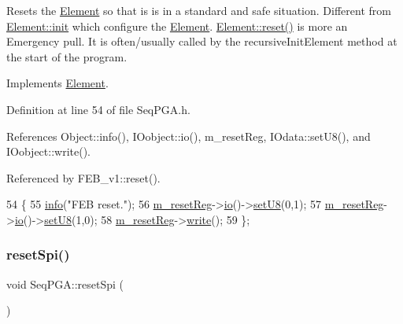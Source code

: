 Resets the \hyperlink{classElement}{Element} so that is is in a standard and safe situation. Different from \hyperlink{classElement_af42754b5cabc198869222725218d695c}{Element\+::init} which configure the \hyperlink{classElement}{Element}. \hyperlink{classElement_a69efffa22f06909d768149715565cb56}{Element\+::reset()} is more an Emergency pull. It is often/usually called by the recursive\+Init\+Element method at the start of the program. 

Implements \hyperlink{classElement_a69efffa22f06909d768149715565cb56}{Element}.



Definition at line 54 of file Seq\+P\+G\+A.\+h.



References Object\+::info(), I\+Oobject\+::io(), m\+\_\+reset\+Reg, I\+Odata\+::set\+U8(), and I\+Oobject\+::write().



Referenced by F\+E\+B\+\_\+v1\+::reset().


\begin{DoxyCode}
54                \{
55     \hyperlink{classObject_a644fd329ea4cb85f54fa6846484b84a8}{info}(\textcolor{stringliteral}{"FEB reset."});
56     \hyperlink{classSeqPGA_a8c519e98b992ab872622e95dae4461d8}{m\_resetReg}->\hyperlink{classIOobject_af04fb94137c3d86849f478ac5afab5d1}{io}()->\hyperlink{classIOdata_a6c4fb2f2af01889ada889c2b7aceb24d}{setU8}(0,1);
57     \hyperlink{classSeqPGA_a8c519e98b992ab872622e95dae4461d8}{m\_resetReg}->\hyperlink{classIOobject_af04fb94137c3d86849f478ac5afab5d1}{io}()->\hyperlink{classIOdata_a6c4fb2f2af01889ada889c2b7aceb24d}{setU8}(1,0);
58     \hyperlink{classSeqPGA_a8c519e98b992ab872622e95dae4461d8}{m\_resetReg}->\hyperlink{classIOobject_a9f6984bc9f0fadcf800f1be2523ac744}{write}();
59   \};
\end{DoxyCode}
\mbox{\label{classSeqPGA_a52f122a1767691eb950a4aae5981edfc}} 
\subsubsection{\texorpdfstring{reset\+Spi()}{resetSpi()}}
{\footnotesize\ttfamily void Seq\+P\+G\+A\+::reset\+Spi (\begin{DoxyParamCaption}{ }\end{DoxyParamCaption})\hspace{0.3cm}{\ttfamily [inline]}}



